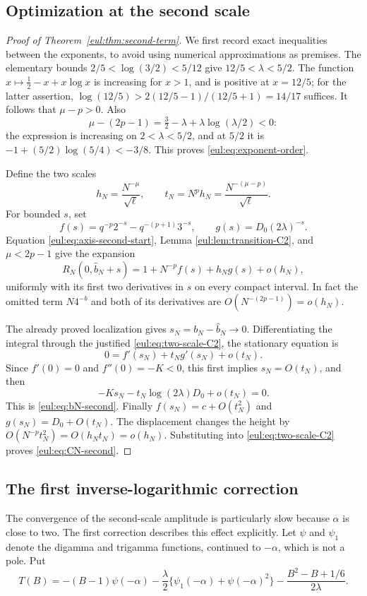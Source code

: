 \subsection{Optimization at the second scale}
\begin{proof}[Proof of Theorem~\ref{eul:thm:second-term}]
We first record exact inequalities between the exponents, to avoid
using numerical approximations as premises.  The elementary bounds
$2/5<\log(3/2)<5/12$ give $12/5<\lambda<5/2$.
The function
$x\mapsto\tfrac12-x+x\log x$ is increasing for $x>1$, and is
positive at $x=12/5$; for the latter assertion,
$\log(12/5)>2(12/5-1)/(12/5+1)=14/17$ suffices.
It follows that $\mu-p>0$.
Also
\[
 \mu-(2p-1)=\tfrac32-\lambda+\lambda\log(\lambda/2)<0:
\]
the expression is increasing on $2<\lambda<5/2$, and at $5/2$ it
is $-1+(5/2)\log(5/4)<-3/8$.
This proves \eqref{eul:eq:exponent-order}.

Define the two scales
\[
 h_N=\frac{N^{-\mu}}{\sqrt\ell},\qquad
 t_N=N^ph_N=\frac{N^{-(\mu-p)}}{\sqrt\ell}.
\]
For bounded $s$, set
\[
 f(s)=q^{-p}2^{-s}-q^{-(p+1)}3^{-s},\qquad
 g(s)=D_0(2\lambda)^{-s}.
\]
Equation \eqref{eul:eq:axis-second-start}, Lemma
\ref{eul:lem:transition-C2}, and $\mu<2p-1$ give the expansion
\begin{equation}\label{eul:eq:two-scale-C2}
 R_N(0,\widehat b_N+s)
   =1+N^{-p}f(s)+h_Ng(s)+o(h_N),
\end{equation}
uniformly with its first two derivatives in $s$ on every compact
interval.  In fact the omitted term $N4^{-b}$ and both of its
derivatives are $O(N^{-(2p-1)})=o(h_N)$.

The already proved localization gives $s_N=b_N-\widehat b_N\to0$.
Differentiating the integral through the justified
\eqref{eul:eq:two-scale-C2}, the stationary equation is
\[
 0=f'(s_N)+t_Ng'(s_N)+o(t_N).
\]
Since $f'(0)=0$ and $f''(0)=-K<0$, this first implies
$s_N=O(t_N)$, and then
\[
 -Ks_N-t_N\log(2\lambda)D_0+o(t_N)=0.
\]
This is \eqref{eul:eq:bN-second}.
Finally $f(s_N)=c+O(t_N^2)$ and $g(s_N)=D_0+O(t_N)$.
The displacement changes the height by
$O(N^{-p}t_N^2)=O(h_Nt_N)=o(h_N)$.
Substituting into \eqref{eul:eq:two-scale-C2} proves
\eqref{eul:eq:CN-second}.
\end{proof}

\subsection{The first inverse-logarithmic correction}
The convergence of the second-scale amplitude is particularly slow
because $\alpha$ is close to two.  The first correction describes
this effect explicitly.  Let $\psi$ and $\psi_1$ denote the digamma
and trigamma functions, continued to $-\alpha$, which is not a pole.
Put
\begin{equation}\label{eul:eq:T-B}
 T(B)=-(B-1)\psi(-\alpha)
 -\frac\lambda2\{\psi_1(-\alpha)+\psi(-\alpha)^2\}
 -\frac{B^2-B+1/6}{2\lambda}.
\end{equation}

